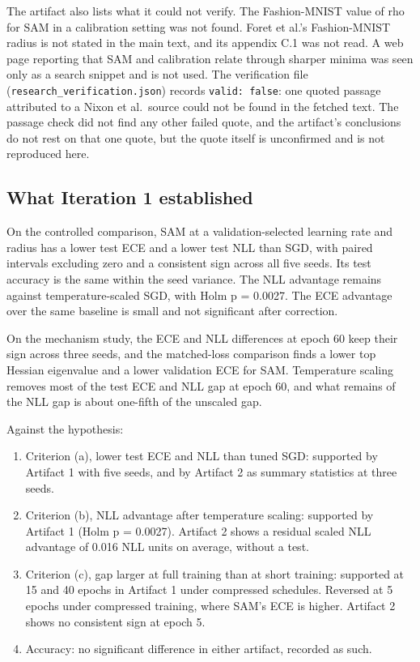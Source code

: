 \documentclass[11pt,letterpaper]{article}
\begin{document}
The artifact also lists what it could not verify. The Fashion-MNIST value of rho for SAM in a calibration setting was not found. Foret et al.'s Fashion-MNIST radius is not stated in the main text, and its appendix C.1 was not read. A web page reporting that SAM and calibration relate through sharper minima was seen only as a search snippet and is not used. The verification file (\texttt{research\_verification.json}) records \texttt{valid: false}: one quoted passage attributed to a Nixon et al.\ source could not be found in the fetched text. The passage check did not find any other failed quote, and the artifact's conclusions do not rest on that one quote, but the quote itself is unconfirmed and is not reproduced here.

\subsection{What Iteration 1 established}

On the controlled comparison, SAM at a validation-selected learning rate and radius has a lower test ECE and a lower test NLL than SGD, with paired intervals excluding zero and a consistent sign across all five seeds. Its test accuracy is the same within the seed variance. The NLL advantage remains against temperature-scaled SGD, with Holm p = 0.0027. The ECE advantage over the same baseline is small and not significant after correction.

On the mechanism study, the ECE and NLL differences at epoch 60 keep their sign across three seeds, and the matched-loss comparison finds a lower top Hessian eigenvalue and a lower validation ECE for SAM. Temperature scaling removes most of the test ECE and NLL gap at epoch 60, and what remains of the NLL gap is about one-fifth of the unscaled gap.

Against the hypothesis:

\begin{enumerate}
\item Criterion (a), lower test ECE and NLL than tuned SGD: supported by Artifact 1 with five seeds, and by Artifact 2 as summary statistics at three seeds.
\item Criterion (b), NLL advantage after temperature scaling: supported by Artifact 1 (Holm p = 0.0027). Artifact 2 shows a residual scaled NLL advantage of 0.016 NLL units on average, without a test.
\item Criterion (c), gap larger at full training than at short training: supported at 15 and 40 epochs in Artifact 1 under compressed schedules. Reversed at 5 epochs under compressed training, where SAM's ECE is higher. Artifact 2 shows no consistent sign at epoch 5.
\item Accuracy: no significant difference in either artifact, recorded as such.
\end{enumerate}
\end{document}
